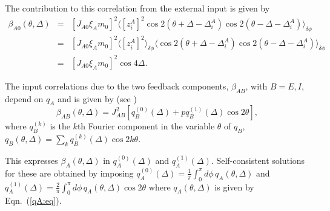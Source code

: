 The contribution to this correlation from the external input is given by
\begin{eqnarray}  
\beta_{A0}(\theta,\Delta) & = &
[J_{A0}\xi_A m_0]^2\langle[z_i^A]^2\cos 2(\theta+\Delta-\Delta_i^A)
\cos 2(\theta-\Delta-\Delta_i^A)\rangle_{\delta\phi} \nonumber \\
 & = &
[J_{A0}\xi_A m_0]^2\langle[z_i^A]^2\rangle_{\delta\phi}
\langle \cos 2(\theta+\Delta-\Delta_i^A)
\cos 2(\theta-\Delta-\Delta_i^A)\rangle_{\delta\phi} \nonumber \\
 & = & [J_{A0}\xi_A m_0]^2 \cos 4\Delta.
\end{eqnarray}

The input correlations due to the two feedback components, $\beta_{AB}$,
with $B=E,I$, depend on $q_{A}$ and is given by
(see \cite{vanVreeswijk2005})
\begin{equation} 
\beta_{AB}(\theta,\Delta)=
J_{AB}^2[q_{B}^{(0)}(\Delta)+pq_{B}^{(1)}(\Delta)\cos 2\theta],
\label{betaA:eq}
\end{equation}
where $q_{B}^{(k)}$ is the $k$th Fourier component in the variable $\theta$ of
$q_{B}$, $q_{B}(\theta,\Delta)=\sum_k q_{B}^{(k)}(\Delta)\cos 2k\theta$\@.

This expresses $\beta_{A}(\theta,\Delta)$ in $q_{A}^{(0)}(\Delta)$ and
$q_{A}^{(1)}(\Delta)$\@. Self-consistent solutions for these are obtained 
by imposing $q_{A}^{(0)}(\Delta)=\frac{1}{\pi}\int_0^\pi\!d\phi\,
q_{A}(\theta,\Delta)$ and $q_{A}^{(1)}(\Delta)=\frac{2}{\pi}
\int_0^\pi\!d\phi\,q_{A}(\theta,\Delta)\cos 2\theta$ where 
$q_{A}(\theta,\Delta)$ is given by Eqn.~(\ref{qA:eq}).

